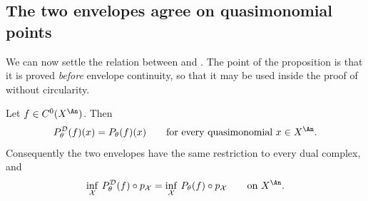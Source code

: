 \subsection{The two envelopes agree on quasimonomial points}
\label{sec:ch23-two-envelopes}

We can now settle the relation between  and
.  The point of the proposition is that it is
proved \emph{before} envelope continuity, so that it may be used inside the
proof of  without circularity.

\begin{proposition}\label{prop:ch23-model-vs-psh-envelope}
Let $f\in C^0(X^{\An})$.  Then
\begin{equation}\label{eq:ch23-two-envelopes-quasimonomial}
 P^{\mathcal D}_\theta(f)(x)=P_\theta(f)(x)
 \qquad\text{for every quasimonomial }x\in X^{\An}.
\end{equation}
Consequently the two envelopes have the same restriction to every dual
complex, and
\begin{equation}\label{eq:ch23-two-envelopes-inf}
 \inf_{\mathcal X}\,P^{\mathcal D}_\theta(f)\circ p_{\mathcal X}
 =\inf_{\mathcal X}\,P_\theta(f)\circ p_{\mathcal X}
 \qquad\text{on }X^{\An}.
\end{equation}
\end{proposition}

